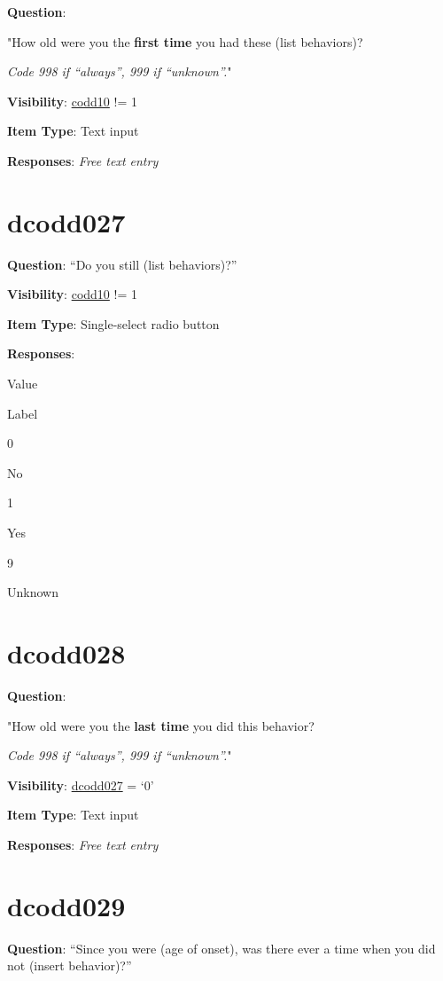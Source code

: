 \documentclass[]{book}
\begin{document}
\textbf{Question}:

"How old were you the \textbf{first time} you had these (list behaviors)?

\emph{Code 998 if ``always'', 999 if ``unknown''.}"

\textbf{Visibility}: \protect\hyperlink{codd10}{codd10} != 1

\textbf{Item Type}: Text input

\textbf{Responses}: \emph{Free text entry}

\hypertarget{dcodd027}{%
\section{dcodd027}\label{dcodd027}}

\textbf{Question}: ``Do you still (list behaviors)?''

\textbf{Visibility}: \protect\hyperlink{codd10}{codd10} != 1

\textbf{Item Type}: Single-select radio button

\textbf{Responses}:

Value

Label

0

No

1

Yes

9

Unknown

\hypertarget{dcodd028}{%
\section{dcodd028}\label{dcodd028}}

\textbf{Question}:

"How old were you the \textbf{last time} you did this behavior?

\emph{Code 998 if ``always'', 999 if ``unknown''.}"

\textbf{Visibility}: \protect\hyperlink{dcodd027}{dcodd027} = `0'

\textbf{Item Type}: Text input

\textbf{Responses}: \emph{Free text entry}

\hypertarget{dcodd029}{%
\section{dcodd029}\label{dcodd029}}

\textbf{Question}: ``Since you were (age of onset), was there ever a time when you did not (insert behavior)?''
\end{document}
